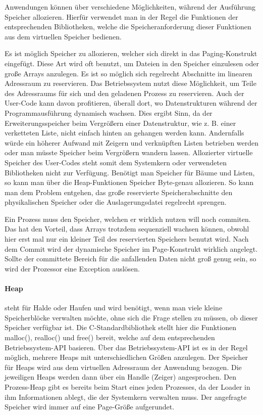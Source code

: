 \documentclass[12pt]{book}
\begin{document}
Anwendungen können über verschiedene Möglichkeiten, während der Ausführung
Speicher allozieren. Hierfür verwendet man in der Regel die Funktionen der
entsprechenden Bibliotheken, welche die Speicheranforderung dieser Funktionen
aus dem virtuellen Speicher bedienen.

Es ist möglich Speicher zu allozieren, welcher sich direkt in das
Paging-Konstrukt eingefügt. Diese Art wird oft benutzt, um Dateien in den
Speicher einzulesen oder große Arrays anzulegen. Es ist so möglich sich
regelrecht Abschnitte im linearen Adressraum zu reservieren. Das
Betriebssystem nutzt diese Möglichkeit, um Teile des Adressraums für sich und
den geladenen Prozess zu reservieren. Auch der User-Code kann davon
profitieren, überall dort, wo Datenstrukturen während der Programmausführung
dynamisch wachsen. Dies ergibt Sinn, da der Erweiterungsspeicher beim
Vergrößern einer Datenstruktur, wie z. B. einer verketteten Liste, nicht
einfach hinten an gehangen werden kann. Andernfalls würde ein höherer Aufwand
mit Zeigern und verknüpften Listen betrieben werden oder man müsste Speicher
beim Vergrößern wandern lassen. Allozierter virtuelle Speicher des User-Codes
steht somit dem Systemkern oder verwendeten Bibliotheken nicht zur Verfügung.
Benötigt man Speicher für Bäume und Listen, so kann man über die
Heap-Funktionen Speicher Byte-genau allozieren. So kann man dem Problem
entgehen, das große reservierte Speicherabschnitte den physikalischen Speicher
oder die Auslagerungsdatei regelrecht sprengen.

Ein Prozess muss den Speicher, welchen er wirklich nutzen will noch commiten.
Das hat den Vorteil, dass Arrays trotzdem sequenziell wachsen können, obwohl
hier erst mal nur ein kleiner Teil des reservierten Speichers benutzt wird.
Nach dem Commit wird der dynamische Speicher im Page-Konstrukt wirklich
angelegt. Sollte der committete Bereich für die anfallenden Daten nicht groß
genug sein, so wird der Prozessor eine Exception auslösen.

\paragraph{Heap}

steht für Halde oder Haufen und wird benötigt, wenn man viele kleine
Speicherblöcke verwalten möchte, ohne sich die Frage stellen zu müssen, ob
dieser Speicher verfügbar ist. Die C-Standardbibliothek stellt hier die
Funktionen malloc(), realloc() und free() bereit, welche auf dem entsprechenden
Betriebssystem-API basieren. Über das Betriebssystem-API ist es in der Regel
möglich, mehrere Heaps mit unterschiedlichen Größen anzulegen. Der Speicher für
Heaps wird aus dem virtuellen Adressraum der Anwendung bezogen. Die jeweiligen
Heaps werden dann über ein Handle (Zeiger) angesprochen. Den Prozess-Heap gibt
es bereits beim Start eines jeden Prozesses, da der Loader in ihm Informationen
ablegt, die der Systemkern verwalten muss. Der angefragte Speicher wird immer
auf eine Page-Größe aufgerundet.
\end{document}
